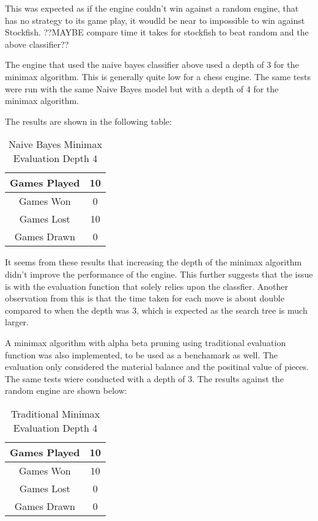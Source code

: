 This was expected as if the engine couldn't win against a random engine, that has no strategy to its game play, it woudld be near to impossible to win against Stockfish. ??MAYBE compare time it takes for stockfish to beat random and the above classifier??

The engine that used the naive bayes classifier above used a depth of 3 for the minimax algorithm. This is generally quite low for a chess engine. The same tests were run with the same Naive Bayes model but with a depth of 4 for the minimax algorithm. 

The results are shown in the following table:

\begin{table}[H]
    \centering
    \begin{tabular}{|c|c|}
    \hline
    Games Played        & 10           \\ \hline
    Games Won           & 0           \\ \hline
    Games Lost          & 10          \\ \hline
    Games Drawn         & 0           \\ \hline
    \end{tabular}
    \caption{Naive Bayes Minimax Evaluation Depth 4}
    \label{tab:naive_bayes_minimax_evaluation_depth_4}
\end{table}

It seems from these results that increasing the depth of the minimax algorithm didn't improve the performance of the engine. This further suggests that the issue is with the evaluation function that solely relies upon the classfier. Another observation from this is that the time taken for each move is about double compared to when the depth was 3, which is expected as the search tree is much larger. 

A minimax algorithm with alpha beta pruning using traditional evaluation function was also implemented, to be used as a benchamark as well. The evaluation only considered the material balance and the positinal value of pieces. The same tests wiere conducted with a depth of 3. The results against the random engine are shown below:

\begin{table}[H]
    \centering
    \begin{tabular}{|c|c|}
    \hline
    Games Played        & 10           \\ \hline
    Games Won           & 10           \\ \hline
    Games Lost          & 0          \\ \hline
    Games Drawn         & 0          \\ \hline
    \end{tabular}
    \caption{Traditional Minimax Evaluation Depth 4}
    \label{tab:traditional_minimax_evaluation_depth_4}
\end{table}

